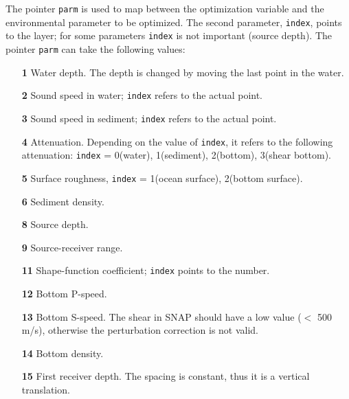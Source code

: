 \documentclass{saclantc}
\begin{document}
The pointer {\tt parm} is used to map between the optimization variable and the
environmental parameter to be optimized. The second parameter, {\tt index}, points to the
layer; for some parameters {\tt index} is not important (source depth).  
The pointer {\tt parm} can take the following values:
\begin{itemize}
    \item[\bf 1]  Water depth. The depth is changed by moving the last 
point in the water.
\vspace{-0.3cm}
    \item[\bf 2] Sound speed in water; {\tt index} refers to the actual point.
\vspace{-0.3cm}
    \item[\bf 3] Sound speed in sediment; {\tt index} refers to the actual point.
\vspace{-0.3cm}
    \item[\bf 4] Attenuation. Depending on the value of  {\tt index},
       it refers to the following attenuation: {\tt index} = 0(water),
1(sediment), 2(bottom), 3(shear bottom).
\vspace{-0.3cm}
    \item[\bf 5]  Surface roughness, {\tt index} = 1(ocean surface), 2(bottom surface).
\vspace{-0.3cm}
    \item[\bf 6] Sediment density.
\vspace{-0.3cm}
    \item[\bf 8] Source depth.
\vspace{-0.3cm}
    \item[\bf 9] Source-receiver range.
\vspace{-0.3cm}
    \item[\bf 11] Shape-function coefficient; {\tt index} points to the number.
\vspace{-0.3cm}
    \item[\bf 12] Bottom P-speed.
\vspace{-0.3cm}
    \item[\bf 13] Bottom S-speed. The shear in
{\sf SNAP} should have a low value ($<$ 500 m/s), otherwise
    the perturbation correction is not valid.
\vspace{-0.3cm}
     \item[\bf 14] Bottom density.
\vspace{-0.3cm}
    \item[\bf 15]  First receiver depth. The spacing is constant, 
    thus it is a vertical translation.
\vspace{-0.3cm}

\end{itemize}
\end{document}
